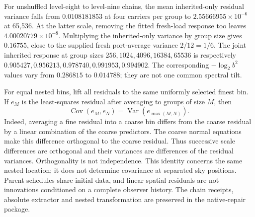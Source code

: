 For unshuffled level-eight to level-nine chains, the mean inherited-only
residual variance falls from \(0.0108181853\) at four carriers per group
to \(2.55666955\times10^{-6}\) at 65,536. At the latter scale, removing
the fitted fresh-load response too leaves \(4.00020779\times10^{-8}\).
Multiplying the inherited-only variance by group size gives \(0.16755\),
close to the supplied fresh port-average variance \(2/12=1/6\).
The joint inherited response at group sizes
\(256,1024,4096,16384,65536\) is respectively
\(0.905427,0.956213,0.978740,0.991953,0.994902\).
The corresponding \(-\log_2 b^2\) values vary from \(0.286815\) to
\(0.014788\); they are not one common spectral tilt.

For equal nested bins, lift all residuals to the same uniformly selected
finest bin. If \(e_M\) is the least-squares residual after averaging to
groups of size \(M\), then
\[
 \operatorname{Cov}(e_M,e_N)=\operatorname{Var}(e_{\max(M,N)}).
\]
Indeed, averaging a fine residual into a coarse bin differs from the
coarse residual by a linear combination of the coarse predictors. The
coarse normal equations make this difference orthogonal to the coarse
residual. Thus successive scale differences are orthogonal and their
variances are differences of the residual variances. Orthogonality is
not independence. This identity concerns the same nested location; it
does not determine covariance at separated sky positions. Parent schedules
share initial data, and linear spatial residuals are not innovations
conditioned on a complete observer history. The chain receipts, absolute
extractor and nested transformation are preserved in the native-repair
package.
